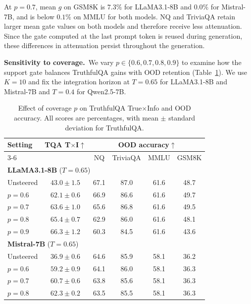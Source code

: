 At $p=0.7$, mean $g$ on GSM8K is $7.3\%$ for LLaMA3.1-8B and $0.0\%$ for Mistral-7B, and is below $0.1\%$ on MMLU for both models. NQ and TriviaQA retain larger mean gate values on both models and therefore receive less attenuation. Since the gate computed at the last prompt token is reused during generation, these differences in attenuation persist throughout the generation.

\noindent\textbf{Sensitivity to coverage.}~We vary $p\in\{0.6,0.7,0.8,0.9\}$ to examine how the support gate balances TruthfulQA gains with OOD retention (Table~\ref{tab:support-gate-coverage}). We use $K=10$ and fix the integration horizon at $T=0.65$ for LLaMA3.1-8B and Mistral-7B and $T=0.4$ for Qwen2.5-7B.

\begin{table}[ht]
\centering
\small
\setlength{\tabcolsep}{6pt}
\caption{Effect of coverage $p$ on TruthfulQA True$\times$Info and OOD accuracy. All scores are percentages, with mean $\pm$ standard deviation for TruthfulQA.}
\label{tab:support-gate-coverage}
\begin{tabular}{lccccc}
\toprule
\multirow{2}{*}{Setting} & \multirow{2}{*}{TQA T$\times$I$\uparrow$} & \multicolumn{4}{c}{OOD accuracy$\uparrow$} \\
\cmidrule(lr){3-6}
 & & NQ & TriviaQA & MMLU & GSM8K \\
\midrule
\multicolumn{6}{l}{\textbf{LLaMA3.1-8B} ($T=0.65$)} \\
\addlinespace[2pt]
Unsteered & $43.0\pm1.5$ & 67.1 & 87.0 & 61.6 & 48.7 \\
$p=0.6$ & $62.1\pm0.6$ & 66.9 & 86.6 & 61.6 & 49.7 \\
$p=0.7$ & $63.6\pm1.0$ & 65.6 & 86.8 & 61.6 & 49.5 \\
$p=0.8$ & $65.4\pm0.7$ & 62.9 & 86.0 & 61.6 & 48.1 \\
$p=0.9$ & $66.3\pm1.2$ & 60.3 & 84.5 & 61.6 & 43.6 \\
\midrule
\multicolumn{6}{l}{\textbf{Mistral-7B} ($T=0.65$)} \\
\addlinespace[2pt]
Unsteered & $36.9\pm0.6$ & 64.6 & 85.9 & 58.1 & 36.2 \\
$p=0.6$ & $59.2\pm0.9$ & 64.1 & 86.0 & 58.1 & 36.3 \\
$p=0.7$ & $60.7\pm0.6$ & 63.8 & 85.6 & 58.1 & 36.3 \\
$p=0.8$ & $62.3\pm0.2$ & 63.5 & 85.5 & 58.1 & 36.3 \\

\end{tabular}
\end{table}
